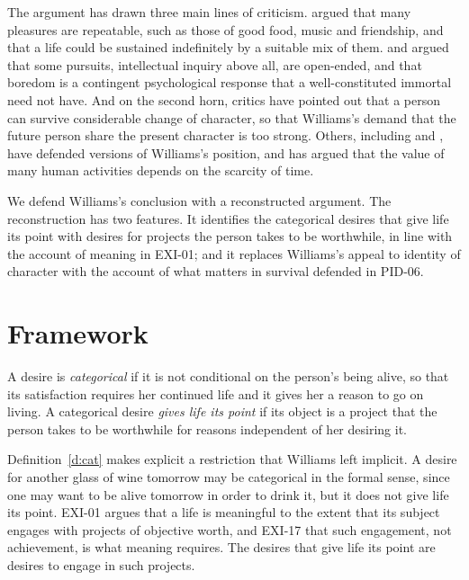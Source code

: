 \documentclass{situationist-preprint}
\begin{document}
The argument has drawn three main lines of criticism. \citet{Fischer1994} argued that many pleasures are repeatable, such as those of good food, music and friendship, and that a life could be sustained indefinitely by a suitable mix of them. \citet{Chappell2009} and \citet{BortolottiNagasawa2009} argued that some pursuits, intellectual inquiry above all, are open-ended, and that boredom is a contingent psychological response that a well-constituted immortal need not have. And on the second horn, critics have pointed out that a person can survive considerable change of character, so that Williams's demand that the future person share the present character is too strong. Others, including \citet{Wisnewski2005} and \citet{Smuts2011}, have defended versions of Williams's position, and \citet{Scheffler2013} has argued that the value of many human activities depends on the scarcity of time.

We defend Williams's conclusion with a reconstructed argument. The reconstruction has two features. It identifies the categorical desires that give life its point with desires for projects the person takes to be worthwhile, in line with the account of meaning in EXI-01; and it replaces Williams's appeal to identity of character with the account of what matters in survival defended in PID-06.

\section{Framework}

\begin{definition}\label{d:cat}
A desire is \emph{categorical} if it is not conditional on the person's being alive, so that its satisfaction requires her continued life and it gives her a reason to go on living. A categorical desire \emph{gives life its point} if its object is a project that the person takes to be worthwhile for reasons independent of her desiring it.
\end{definition}

Definition~\ref{d:cat} makes explicit a restriction that Williams left implicit. A desire for another glass of wine tomorrow may be categorical in the formal sense, since one may want to be alive tomorrow in order to drink it, but it does not give life its point. EXI-01 argues that a life is meaningful to the extent that its subject engages with projects of objective worth, and EXI-17 that such engagement, not achievement, is what meaning requires. The desires that give life its point are desires to engage in such projects.
\end{document}
